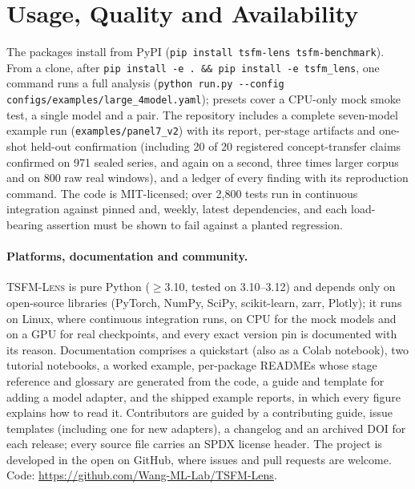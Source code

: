\documentclass[twoside,11pt]{article}
\newcommand{\repourl}{https://github.com/Wang-ML-Lab/TSFM-Lens}
\newcommand{\tool}{\textsc{TSFM-Lens}}
\begin{document}
\section{Usage, Quality and Availability}

The packages install from PyPI (\texttt{pip install tsfm-lens tsfm-benchmark}). From a clone,
after \texttt{pip install -e . \&\& pip install -e tsfm\_lens}, one command runs a full analysis
(\texttt{python run.py -{}-config configs/examples/large\_4model.yaml}); presets cover a CPU-only mock smoke test, a
single model and a pair. The repository includes a complete seven-model example run (\texttt{examples/panel7\_v2}) with its report,
per-stage artifacts and one-shot held-out confirmation (including 20 of 20 registered concept-transfer claims confirmed on 971 sealed series,
and again on a second, three times larger corpus and on 800 raw real windows), and a ledger of
every finding with its reproduction command. The code is MIT-licensed; over 2{,}800 tests
run in continuous integration against pinned and, weekly, latest dependencies, and each load-bearing assertion must
be shown to fail against a planted regression.

\paragraph{Platforms, documentation and community.} \tool{} is pure Python ($\geq$3.10, tested on 3.10--3.12) and
depends only on open-source libraries (PyTorch, NumPy, SciPy, scikit-learn, zarr, Plotly); it runs on Linux, where continuous
integration runs, on CPU for the mock models and on a GPU for real checkpoints, and every exact version pin is documented with its reason.
Documentation comprises a quickstart (also as a Colab notebook), two tutorial notebooks, a worked example, per-package
READMEs whose stage reference and glossary are generated from the code, a guide and template for adding
a model adapter, and the shipped example reports, in which every figure explains how to read it. Contributors are guided by a
contributing guide, issue templates (including one for new adapters), a changelog and an archived DOI for each release; every source file carries
an SPDX license header. The project is developed in the open on GitHub, where issues and pull requests are welcome. Code: \url{\repourl}.


{\setlength{\bibsep}{0pt}}
\end{document}
